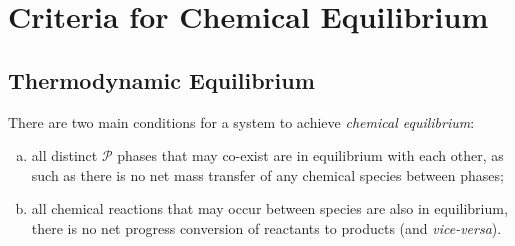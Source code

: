 \section{Criteria for Chemical Equilibrium}\label{Chapter:VLE:ChemicalEquilibrium}
\subsection{Thermodynamic Equilibrium}\label{Chapter:VLE:thermodynamicEquilibrium}

There are two main conditions for a system to achieve {\it chemical equilibrium}:
  \begin{enumerate}[a)]
     \item all distinct $\mathcal{P}$ phases that may co-exist are in equilibrium with each other, as such as there is no net mass transfer of any chemical species between phases;
     \item all chemical reactions that may occur between species are also in equilibrium, \ie there is no net progress \wrt conversion of reactants to products (and {\it vice-versa}).
  \end{enumerate}

